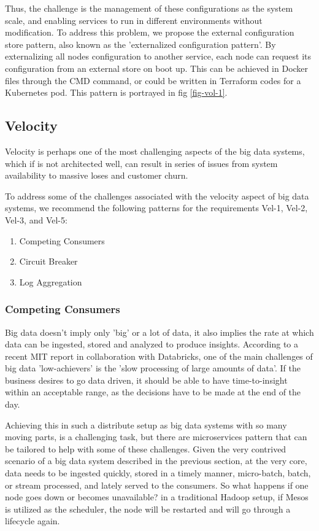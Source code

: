 \documentclass[conference]{IEEEtran}
\begin{document}
Thus, the challenge is the management of these configurations as the system scale, and enabling services to run in different environments without modification. To address this problem, we propose the external configuration store pattern, also known as the 'externalized configuration pattern'. By externalizing all nodes configuration to another service, each node can request its configuration from an external store on boot up. This can be achieved in Docker files through the CMD command, or could be written in Terraform codes for a Kubernetes pod. This pattern is portrayed in fig \ref{fig-vol-1}.

\subsection{Velocity}

Velocity is perhaps one of the most challenging aspects of the big data systems, which if is not architected well, can result in series of issues from system availability to massive loses and customer churn. 

To address some of the challenges associated with the velocity aspect of big data systems, we recommend the following patterns for the requirements Vel-1, Vel-2, Vel-3, and Vel-5: 

\begin{enumerate}
    \item Competing Consumers
    \item Circuit Breaker
    \item Log Aggregation
\end{enumerate}

\subsubsection{Competing Consumers}

Big data doesn't imply only 'big' or a lot of data, it also implies the rate at which data can be ingested, stored and analyzed to produce insights. According to a recent MIT report in collaboration with Databricks, one of the main challenges of big data 'low-achievers' is the 'slow processing of large amounts of data'. If the business desires to go data driven, it should be able to have time-to-insight within an acceptable range, as the decisions have to be made at the end of the day. 

Achieving this in such a distribute setup as big data systems with so many moving parts, is a challenging task, but there are microservices pattern that can be tailored to help with some of these challenges. Given the very contrived scenario of a big data system described in the previous section, at the very core, data needs to be ingested quickly, stored in a timely manner, micro-batch, batch, or stream processed, and lately served to the consumers. So what happens if one node goes down or becomes unavailable? in a traditional Hadoop setup, if Mesos is utilized as the scheduler, the node will be restarted and will go through a lifecycle again. 
\end{document}
